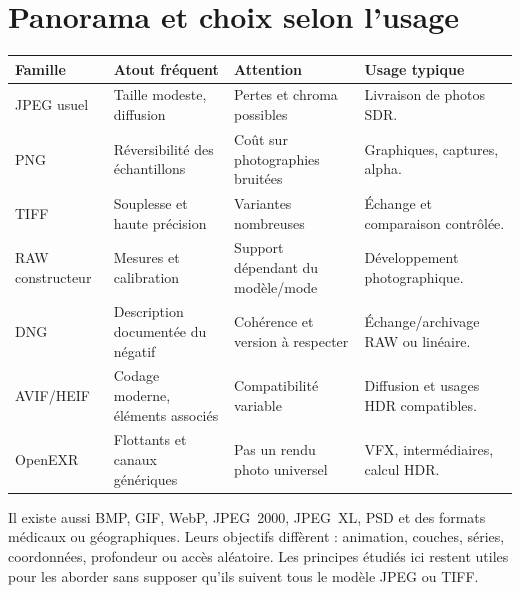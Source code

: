 \section{Panorama et choix selon l'usage}
\begin{longtable}{p{2.1cm}p{4.1cm}p{4.4cm}p{3.9cm}}
\toprule Famille & Atout fréquent & Attention & Usage typique \\ \midrule
JPEG usuel & Taille modeste, diffusion & Pertes et chroma possibles & Livraison de photos SDR. \\
PNG & Réversibilité des échantillons & Coût sur photographies bruitées & Graphiques, captures, alpha. \\
TIFF & Souplesse et haute précision & Variantes nombreuses & Échange et comparaison contrôlée. \\
RAW constructeur & Mesures et calibration & Support dépendant du modèle/mode & Développement photographique. \\
DNG & Description documentée du négatif & Cohérence et version à respecter & Échange/archivage RAW ou linéaire. \\
AVIF/\allowbreak HEIF & Codage moderne, éléments associés & Compatibilité variable & Diffusion et usages HDR compatibles. \\
OpenEXR & Flottants et canaux génériques & Pas un rendu photo universel & VFX, intermédiaires, calcul HDR. \\
\bottomrule
\end{longtable}
Il existe aussi BMP, GIF, WebP, JPEG~2000, JPEG~XL, PSD et
des formats médicaux ou géographiques. Leurs objectifs
diffèrent : animation, couches, séries, coordonnées,
profondeur ou accès aléatoire. Les principes étudiés ici
restent utiles pour les aborder sans supposer qu'ils suivent
tous le modèle JPEG ou TIFF.
